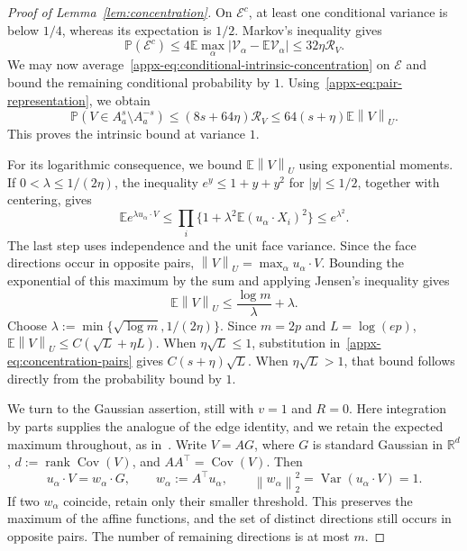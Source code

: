 \documentclass[11pt,letterpaper]{article}
\theoremstyle{remark}
\newcommand{\E}{\mathbb E}
\newcommand{\Pp}{\mathbb P}
\newcommand{\R}{\mathbb R}
\newcommand{\Cov}{\operatorname{Cov}}
\newcommand{\Var}{\operatorname{Var}}
\newcommand{\norm}[1]{\left\lVert#1\right\rVert}
\begin{document}
\begin{proof}[Proof of Lemma~\ref{lem:concentration}]
On $\mathcal E^c$, at least one conditional variance is below
$1/4$, whereas its expectation is $1/2$. Markov's inequality gives
\begin{equation}
 \Pp(\mathcal E^c)
 \le4\E\max_\alpha|\mathcal V_\alpha-\E\mathcal V_\alpha|
 \le32\eta\mathcal R_V.
 \label{appx-eq:conditional-variance}
\end{equation}
We may now average~\eqref{appx-eq:conditional-intrinsic-concentration}
on $\mathcal E$ and bound the remaining conditional probability
by $1$. Using~\eqref{appx-eq:pair-representation}, we obtain
\begin{equation}
 \Pp(V\in A_a^s\setminus A_a^{-s})
 \le(8s+64\eta)\mathcal R_V
 \le64(s+\eta)\E\norm V_U.
 \label{appx-eq:concentration-pairs}
\end{equation}
This proves the intrinsic bound at variance $1$.

For its logarithmic consequence, we bound $\E\norm V_U$ using
exponential moments. If $0<\lambda\le1/(2\eta)$, the inequality
$e^y\le1+y+y^2$ for $|y|\le1/2$, together with centering, gives
\[
 \E e^{\lambda u_\alpha\cdot V}
 \le\prod_i\{1+\lambda^2\E(u_\alpha\cdot X_i)^2\}
 \le e^{\lambda^2}.
\]
The last step uses independence and the unit face variance.
Since the face directions occur in opposite pairs,
$\norm V_U=\max_\alpha u_\alpha\cdot V$.
Bounding the exponential of this maximum by the sum and applying
Jensen's inequality gives
\[
 \E\norm V_U\le\frac{\log m}{\lambda}+\lambda.
\]
Choose $\lambda:=\min\{\sqrt{\log m},1/(2\eta)\}$.
Since $m=2p$ and $L=\log(ep)$,
$\E\norm V_U\le C(\sqrt L+\eta L)$.
When $\eta\sqrt L\le1$, substitution
in~\eqref{appx-eq:concentration-pairs} gives $C(s+\eta)\sqrt L$.
When $\eta\sqrt L>1$, that bound follows directly from the
probability bound by $1$.

We turn to the Gaussian assertion, still with $v=1$ and $R=0$.
Here integration by parts supplies the analogue of the edge
identity, and we retain the expected maximum throughout,
as in~\cite{ChernozhukovAC2026}.
Write $V=AG$, where $G$ is standard Gaussian in $\R^d$,
$d:=\operatorname{rank}\Cov(V)$, and $AA^\top=\Cov(V)$.
Then
\[
 u_\alpha\cdot V=w_\alpha\cdot G,\qquad
 w_\alpha:=A^\top u_\alpha,\qquad
 \norm{w_\alpha}_2^2=\Var(u_\alpha\cdot V)=1.
\]
If two $w_\alpha$ coincide, retain only their smaller threshold.
This preserves the maximum of the affine functions, and the set of
distinct directions still occurs in opposite pairs. The number of
remaining directions is at most $m$.


\end{proof}
\end{document}
